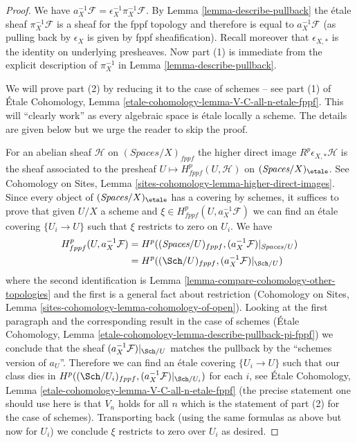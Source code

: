 \begin{proof}
We have $a_X^{-1}\mathcal{F} = \epsilon_X^{-1} \pi_X^{-1}\mathcal{F}$.
By Lemma \ref{lemma-describe-pullback} the \'etale sheaf
$\pi_X^{-1}\mathcal{F}$ is a sheaf for the fppf topology
and therefore is equal to $a_X^{-1}\mathcal{F}$ (as pulling
back by $\epsilon_X$ is given by fppf sheafification).
Recall moreover that $\epsilon_{X, *}$ is the identity
on underlying presheaves.
Now part (1) is immediate from the explicit description of $\pi_X^{-1}$
in Lemma \ref{lemma-describe-pullback}.

\medskip\noindent
We will prove part (2) by reducing it to the case of schemes --
see part (1) of
\'Etale Cohomology, Lemma \ref{etale-cohomology-lemma-V-C-all-n-etale-fppf}.
This will ``clearly work'' as every algebraic space is
\'etale locally a scheme. The details are given below but we urge
the reader to skip the proof.

\medskip\noindent
For an abelian sheaf $\mathcal{H}$ on $(\textit{Spaces}/X)_{fppf}$ the
higher direct image $R^p\epsilon_{X, *}\mathcal{H}$ is the sheaf
associated to the presheaf $U \mapsto H^p_{fppf}(U, \mathcal{H})$
on $(\textit{Spaces}/X)_\etale$. See
Cohomology on Sites, Lemma \ref{sites-cohomology-lemma-higher-direct-images}.
Since every object of $(\textit{Spaces}/X)_\etale$ has a covering
by schemes, it suffices to prove that given $U/X$ a scheme and
$\xi \in H^p_{fppf}(U, a_X^{-1}\mathcal{F})$ we can find
an \'etale covering $\{U_i \to U\}$ such that $\xi$
restricts to zero on $U_i$. We have
\begin{align*}
H^p_{fppf}(U, a_X^{-1}\mathcal{F})
& =
H^p((\textit{Spaces}/U)_{fppf}, (a_X^{-1}\mathcal{F})|_{\textit{Spaces}/U}) \\
& =
H^p((\Sch/U)_{fppf}, (a_X^{-1}\mathcal{F})|_{\Sch/U})
\end{align*}
where the second identification is
Lemma \ref{lemma-compare-cohomology-other-topologies}
and the first is a general fact about restriction
(Cohomology on Sites, Lemma \ref{sites-cohomology-lemma-cohomology-of-open}).
Looking at the first paragraph and the corresponding result in the
case of schemes (\'Etale Cohomology, Lemma
\ref{etale-cohomology-lemma-describe-pullback-pi-fppf})
we conclude that the sheaf $(a_X^{-1}\mathcal{F})|_{\Sch/U}$
matches the pullback by the ``schemes version of $a_U$''.
Therefore we can find an \'etale covering
$\{U_i \to U\}$ such that our class dies in
$H^p((\Sch/U_i)_{fppf}, (a_X^{-1}\mathcal{F})|_{\Sch/U_i})$
for each $i$, see
\'Etale Cohomology, Lemma \ref{etale-cohomology-lemma-V-C-all-n-etale-fppf}
(the precise statement one should use here is that $V_n$ holds for all $n$
which is the statement of part (2) for the case of schemes).
Transporting back (using the same formulas as above but now for
$U_i$) we conclude $\xi$ restricts to zero over $U_i$ as desired.
\end{proof}

